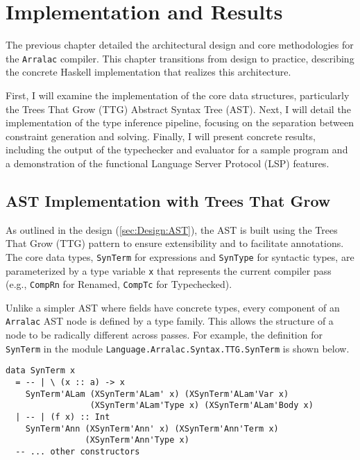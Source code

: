 \chapter{Implementation and Results}
\label{chap:ImplementationAndResults}

The previous chapter detailed the architectural design and core methodologies for the \texttt{Arralac} compiler. This chapter transitions from design to practice, describing the concrete Haskell implementation that realizes this architecture.

First, I will examine the implementation of the core data structures, particularly the Trees That Grow (TTG) Abstract Syntax Tree (AST). Next, I will detail the implementation of the type inference pipeline, focusing on the separation between constraint generation and solving. Finally, I will present concrete results, including the output of the typechecker and evaluator for a sample program and a demonstration of the functional Language Server Protocol (LSP) features.

\section{AST Implementation with Trees That Grow}
\label{sec:Implementation:AST}

As outlined in the design (\cref{sec:Design:AST}), the AST is built using the Trees That Grow (TTG) pattern to ensure extensibility and to facilitate annotations. The core data types, \texttt{SynTerm} for expressions and \texttt{SynType} for syntactic types, are parameterized by a type variable \texttt{x} that represents the current compiler pass (e.g., \texttt{CompRn} for Renamed, \texttt{CompTc} for Typechecked).

Unlike a simpler AST where fields have concrete types, every component of an \texttt{Arralac} AST node is defined by a type family. This allows the structure of a node to be radically different across passes. For example, the definition for \texttt{SynTerm} in the module \texttt{Language.Arralac.Syntax.TTG.SynTerm} is shown below.

\begin{verbatim}
data SynTerm x
  = -- | \ (x :: a) -> x
    SynTerm'ALam (XSynTerm'ALam' x) (XSynTerm'ALam'Var x) 
                 (XSynTerm'ALam'Type x) (XSynTerm'ALam'Body x)
  | -- | (f x) :: Int
    SynTerm'Ann (XSynTerm'Ann' x) (XSynTerm'Ann'Term x) 
                (XSynTerm'Ann'Type x)
  -- ... other constructors
\end{verbatim}

